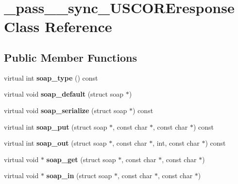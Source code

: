 \hypertarget{class__pass____sync__USCOREresponse}{
\section{\_\-pass\_\-\_\-sync\_\-USCOREresponse Class Reference}
\label{class__pass____sync__USCOREresponse}
}
\subsection*{Public Member Functions}
\begin{DoxyCompactItemize}
\item 
\hypertarget{class__pass____sync__USCOREresponse_a54c41ef0af87cb66fffddda9878e2c49}{
virtual int {\bfseries soap\_\-type} () const }
\label{class__pass____sync__USCOREresponse_a54c41ef0af87cb66fffddda9878e2c49}

\item 
\hypertarget{class__pass____sync__USCOREresponse_a45c4ea8a0df415a6a401496c94e0b908}{
virtual void {\bfseries soap\_\-default} (struct soap $\ast$)}
\label{class__pass____sync__USCOREresponse_a45c4ea8a0df415a6a401496c94e0b908}

\item 
\hypertarget{class__pass____sync__USCOREresponse_a7a792f8c6ebc611db42a0531555e90f0}{
virtual void {\bfseries soap\_\-serialize} (struct soap $\ast$) const }
\label{class__pass____sync__USCOREresponse_a7a792f8c6ebc611db42a0531555e90f0}

\item 
\hypertarget{class__pass____sync__USCOREresponse_a7a94f2fc304c9a3dabc5269db0070fac}{
virtual int {\bfseries soap\_\-put} (struct soap $\ast$, const char $\ast$, const char $\ast$) const }
\label{class__pass____sync__USCOREresponse_a7a94f2fc304c9a3dabc5269db0070fac}

\item 
\hypertarget{class__pass____sync__USCOREresponse_a9aa09558df8ca50c50a5d62a9dc3c3b5}{
virtual int {\bfseries soap\_\-out} (struct soap $\ast$, const char $\ast$, int, const char $\ast$) const }
\label{class__pass____sync__USCOREresponse_a9aa09558df8ca50c50a5d62a9dc3c3b5}

\item 
\hypertarget{class__pass____sync__USCOREresponse_abdd1fc3509cb28c55c512b9f9b960301}{
virtual void $\ast$ {\bfseries soap\_\-get} (struct soap $\ast$, const char $\ast$, const char $\ast$)}
\label{class__pass____sync__USCOREresponse_abdd1fc3509cb28c55c512b9f9b960301}

\item 
\hypertarget{class__pass____sync__USCOREresponse_aa36b8ac084dfdcac70b04bc01aa38aee}{
virtual void $\ast$ {\bfseries soap\_\-in} (struct soap $\ast$, const char $\ast$, const char $\ast$)}
\label{class__pass____sync__USCOREresponse_aa36b8ac084dfdcac70b04bc01aa38aee}

\end{DoxyCompactItemize}
